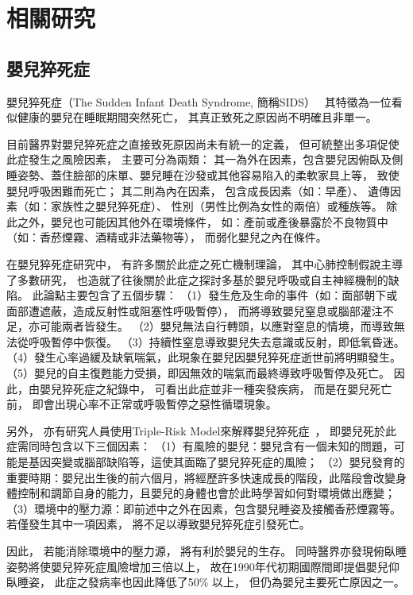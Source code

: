 \documentclass[class=NCU_thesis, crop=false]{standalone}
\begin{document}
\chapter{相關研究}

\section{嬰兒猝死症}
嬰兒猝死症（The Sudden Infant Death Syndrome, 簡稱SIDS）~\cite{kinney_sudden_2009}
其特徵為一位看似健康的嬰兒在睡眠期間突然死亡，
其真正致死之原因尚不明確且非單一。

目前醫界對嬰兒猝死症之直接致死原因尚未有統一的定義，
但可統整出多項促使此症發生之風險因素，
主要可分為兩類：
其一為外在因素，包含嬰兒因俯臥及側睡姿勢、蓋住臉部的床單、嬰兒睡在沙發或其他容易陷入的柔軟家具上等，
致使嬰兒呼吸困難而死亡；
其二則為內在因素，
包含成長因素（如：早產）、
遺傳因素（如：家族性之嬰兒猝死症）、
性別（男性比例為女性的兩倍）或種族等。
除此之外，嬰兒也可能因其他外在環境條件，
如：產前或產後暴露於不良物質中（如：香菸煙霧、酒精或非法藥物等），
而弱化嬰兒之內在條件。

在嬰兒猝死症研究中，
有許多關於此症之死亡機制理論，
其中心肺控制假說主導了多數研究，
也造就了往後關於此症之探討多基於嬰兒呼吸或自主神經機制的缺陷。
此論點主要包含了五個步驟：
（1）發生危及生命的事件（如：面部朝下或面部遭遮蔽，造成反射性或阻塞性呼吸暫停），
而將導致嬰兒窒息或腦部灌注不足，亦可能兩者皆發生。
（2）嬰兒無法自行轉頭，以應對窒息的情境，而導致無法從呼吸暫停中恢復。
（3）持續性窒息導致嬰兒失去意識或反射，即低氧昏迷。
（4）發生心率過緩及缺氧喘氣，此現象在嬰兒因嬰兒猝死症逝世前將明顯發生。
（5）嬰兒的自主復甦能力受損，即因無效的喘氣而最終導致呼吸暫停及死亡。
因此，由嬰兒猝死症之紀錄中，
可看出此症並非一種突發疾病，
而是在嬰兒死亡前，
即會出現心率不正常或呼吸暫停之惡性循環現象。

另外，
亦有研究人員使用Triple-Risk Model來解釋嬰兒猝死症~\cite{noauthor_what_nodate}，
即嬰兒死於此症需同時包含以下三個因素：
（1）有風險的嬰兒：嬰兒含有一個未知的問題，可能是基因突變或腦部缺陷等，這使其面臨了嬰兒猝死症的風險；
（2）嬰兒發育的重要時期：嬰兒出生後的前六個月，將經歷許多快速成長的階段，此階段會改變身體控制和調節自身的能力，且嬰兒的身體也會於此時學習如何對環境做出應變；
（3）環境中的壓力源：即前述中之外在因素，包含嬰兒睡姿及接觸香菸煙霧等。
若僅發生其中一項因素，
將不足以導致嬰兒猝死症引發死亡。

因此，
若能消除環境中的壓力源，
將有利於嬰兒的生存。
同時醫界亦發現俯臥睡姿勢將使嬰兒猝死症風險增加三倍以上，
故在1990年代初期國際間即提倡嬰兒仰臥睡姿，
此症之發病率也因此降低了50\% 以上，
但仍為嬰兒主要死亡原因之一。
\end{document}
